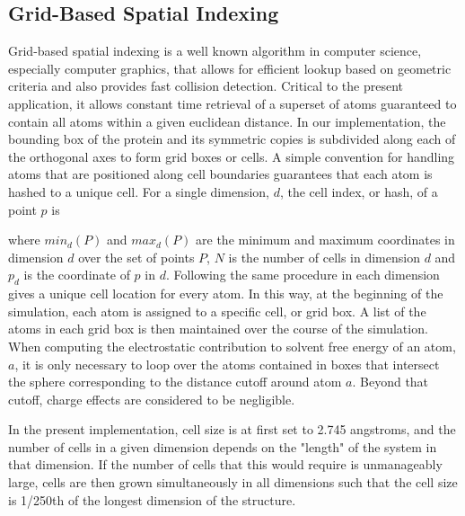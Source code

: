 \subsection*{Grid-Based Spatial Indexing}
\label{subsec:grid_based_indexing}
Grid-based spatial indexing is a well known algorithm in computer science, especially computer graphics, that allows for efficient lookup based on geometric criteria and also provides fast collision detection\cite{bentley1979data}.
Critical to the present application, it allows constant time retrieval of a superset of atoms guaranteed to contain all atoms within a given euclidean distance.
In our implementation, the bounding box of the protein and its symmetric copies is subdivided along each of the orthogonal axes to form grid boxes or cells.
A simple convention for handling atoms that are positioned along cell boundaries guarantees that each atom is hashed to a unique cell.
For a single dimension, $d$, the cell index, or hash, of a point $p$ is 

where $min_d(P)$ and $max_d(P)$ are the minimum and maximum coordinates in dimension $d$ over the set of points $P$, $N$ is the number of cells in dimension $d$ and $p_{d}$ is the coordinate of $p$ in $d$.
Following the same procedure in each dimension gives a unique cell location for every atom.
In this way, at the beginning of the simulation, each atom is assigned to a specific cell, or grid box.
A list of the atoms in each grid box is then maintained over the course of the simulation.
When computing the electrostatic contribution to solvent free energy of an atom, $a$, it is only necessary to loop over the atoms contained in boxes that intersect the sphere corresponding to the distance cutoff around atom $a$. 
Beyond that cutoff, charge effects are considered to be negligible\cite{gallicchio2004agbnp}.

In the present implementation, cell size is at first set to 2.745 angstroms, and the number of cells in a given dimension depends on the "length" of the system in that dimension.
If the number of cells that this would require is unmanageably large, cells are then grown simultaneously in all dimensions such that the cell size is 1/250th of the longest dimension of the structure.

